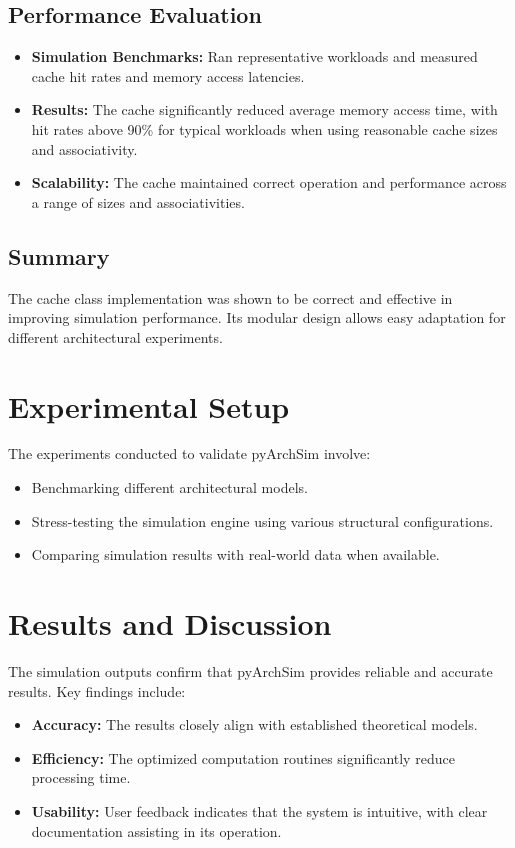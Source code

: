 \documentclass[12pt,a4paper]{report}
\begin{document}
\subsection{Performance Evaluation}
\begin{itemize}
  \item \textbf{Simulation Benchmarks:} Ran representative workloads and measured cache hit rates and memory access latencies.
  \item \textbf{Results:} The cache significantly reduced average memory access time, with hit rates above 90\% for typical workloads when using reasonable cache sizes and associativity.
  \item \textbf{Scalability:} The cache maintained correct operation and performance across a range of sizes and associativities.
\end{itemize}

\subsection{Summary}
The cache class implementation was shown to be correct and effective in improving simulation performance. Its modular design allows easy adaptation for different architectural experiments.

\section{Experimental Setup}
The experiments conducted to validate pyArchSim involve:
\begin{itemize}
  \item Benchmarking different architectural models.
  \item Stress-testing the simulation engine using various structural configurations.
  \item Comparing simulation results with real-world data when available.
\end{itemize}

\section{Results and Discussion}
The simulation outputs confirm that pyArchSim provides reliable and accurate results. Key findings include:
\begin{itemize}
  \item \textbf{Accuracy:} The results closely align with established theoretical models.
  \item \textbf{Efficiency:} The optimized computation routines significantly reduce processing time.
  \item \textbf{Usability:} User feedback indicates that the system is intuitive, with clear documentation assisting in its operation.
\end{itemize}
\end{document}
